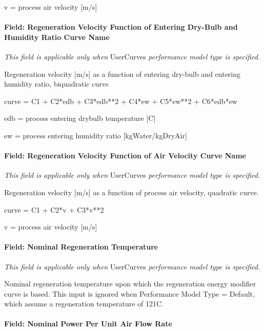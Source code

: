 v = process air velocity {[}m/s{]}

\paragraph{Field: Regeneration Velocity Function of Entering Dry-Bulb and Humidity Ratio Curve Name}\label{field-regeneration-velocity-function-of-entering-dry-bulb-and-humidity-ratio-curve-name}

\emph{This field is applicable only when} UserCurves \emph{performance model type is specified.}

Regeneration velocity {[}m/s{]} as a function of entering dry-bulb and entering humidity ratio, biquadratic curve

curve = C1 + C2*edb + C3*edb**2 + C4*ew + C5*ew**2 + C6*edb*ew

edb = process entering drybulb temperature {[}C{]}

ew = process entering humidity ratio {[}kgWater/kgDryAir{]}

\paragraph{Field: Regeneration Velocity Function of Air Velocity Curve Name}\label{field-regeneration-velocity-function-of-air-velocity-curve-name}

\emph{This field is applicable only when} UserCurves \emph{performance model type is specified.}

Regeneration velocity {[}m/s{]} as a function of process air velocity, quadratic curve.

curve = C1 + C2*v + C3*v**2

v = process air velocity {[}m/s{]}

\paragraph{Field: Nominal Regeneration Temperature}\label{field-nominal-regeneration-temperature}

\emph{This field is applicable only when} UserCurves \emph{performance model type is specified.}

Nominal regeneration temperature upon which the regeneration energy modifier curve is based. This input is ignored when Performance Model Type = Default, which assume a regeneration temperature of 121C.

\paragraph{Field: Nominal Power Per Unit Air Flow Rate}\label{field-nominal-power-per-unit-air-flow-rate}

